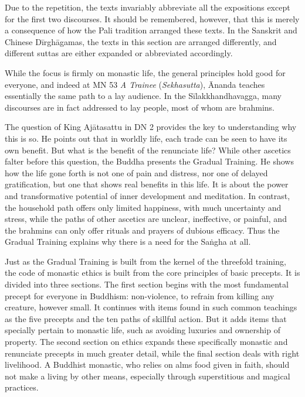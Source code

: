 \documentclass[12pt,openany]{book}%
\begin{document}
Due to the repetition, the texts invariably abbreviate all the expositions except for the first two discourses. It should be remembered, however, that this is merely a consequence of how the Pali tradition arranged these texts. In the Sanskrit and Chinese \textsanskrit{Dīrghāgamas}, the texts in this section are arranged differently, and different suttas are either expanded or abbreviated accordingly.

While the focus is firmly on monastic life, the general principles hold good for everyone, and indeed at MN 53 \textit{A Trainee} (\textit{Sekhasutta}), Ānanda teaches essentially the same path to a lay audience. In the \textsanskrit{Sīlakkhandhavagga}, many discourses are in fact addressed to lay people, most of whom are brahmins.

The question of King \textsanskrit{Ajātasattu} in DN 2 provides the key to understanding why this is so. He points out that in worldly life, each trade can be seen to have its own benefit. But what is the benefit of the renunciate life? While other ascetics falter before this question, the Buddha presents the Gradual Training. He shows how the life gone forth is not one of pain and distress, nor one of delayed gratification, but one that shows real benefits in this life. It is about the power and transformative potential of inner development and meditation. In contrast, the household path offers only limited happiness, with much uncertainty and stress, while the paths of other ascetics are unclear, ineffective, or painful, and the brahmins can only offer rituals and prayers of dubious efficacy. Thus the Gradual Training explains why there is a need for the \textsanskrit{Saṅgha} at all.

Just as the Gradual Training is built from the kernel of the threefold training, the code of monastic ethics is built from the core principles of basic precepts. It is divided into three sections. The first section begins with the most fundamental precept for everyone in Buddhism: non-violence, to refrain from killing any creature, however small. It continues with items found in such common teachings as the five precepts and the ten paths of skillful action. But it adds items that specially pertain to monastic life, such as avoiding luxuries and ownership of property. The second section on ethics expands these specifically monastic and renunciate precepts in much greater detail, while the final section deals with right livelihood. A Buddhist monastic, who relies on alms food given in faith, should not make a living by other means, especially through superstitious and magical practices.
\end{document}
